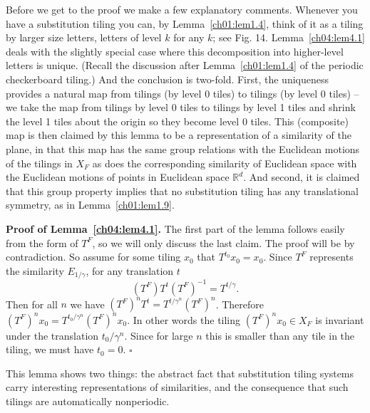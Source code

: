 \documentclass[reqno]{stml-l}
\theoremstyle{plain}
\theoremstyle{definition}
\numberwithin{equation}{chapter}
\begin{document}
Before we get to the proof we make a few explanatory comments. Whenever you have a substitution tiling you can, by Lemma~\ref{ch01:lem1.4}, think of it as a tiling by larger size letters, letters of level $k$ for any $k$; see Fig. 14. Lemma~\ref{ch04:lem4.1} deals with the slightly special case where this decomposition into higher-level letters is unique. (Recall the discussion after Lemma~\ref{ch01:lem1.4} of the periodic checkerboard tiling.) And the conclusion is two-fold. First, the uniqueness provides a natural map from tilings (by level $0$ tiles) to tilings (by level $0$ tiles) -- we take the map from tilings by level $0$ tiles to tilings by level 1 tiles and shrink the level 1 tiles about the origin so they become level $0$ tiles. This (composite) map is then claimed by this lemma to be a representation of a similarity of the plane, in that this map has the same group relations with the Euclidean motions of the tilings in $X_{F}$ as does the corresponding similarity of Euclidean space with the Euclidean motions of points in Euclidean space $\mathbb{R}^{d}$. And second, it is claimed that this group property implies that no substitution tiling has any translational symmetry, as in Lemma~\ref{ch01:lem1.9}.

\textbf{Proof of Lemma~\ref{ch04:lem4.1}.} The first part of the lemma follows easily from the form of $T^{F}$, so we will only discuss the last claim. The proof will be by contradiction. So assume for some tiling $x_{0}$ that $T^{t_{0}}x_{0}= x_{0}$. Since $T^{F}$ represents the similarity $E_{1/\gamma}$, for any translation $t$
\begin{equation}\label{ch04:eqn4.4}
(T^{F})T^{t}(T^{F})^{-1}=T^{t/\gamma}.
\end{equation}
Then for all $n$ we have $(T^{F})^{n}T^{t}=T^{t/\gamma^{n}}(T^{F})^{n}$. Therefore $(T^{F})^{n}x_{0}= T^{t_{0}/\gamma^{n}}(T^{F})^{n}x_{0}$. In other words the tiling $(T^{F})^{n}x_{0}\in X_{F}$ is invariant under the translation $t_{0}/\gamma^{n}$. Since for large $n$ this is smaller than any tile in the tiling, we must have $t_{0}=0$.
\hfill$\square$

This lemma shows two things: the abstract fact that substitution tiling systems carry interesting representations of similarities, and the consequence that such tilings are automatically nonperiodic.
\end{document}
